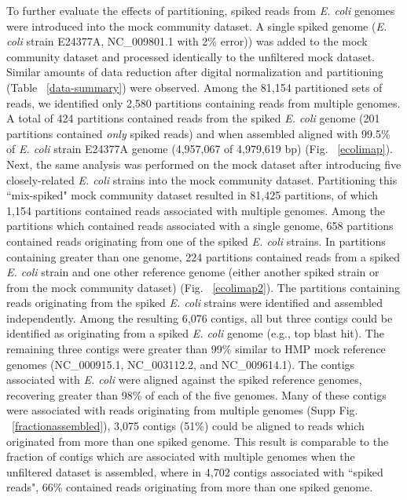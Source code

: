 \documentclass[11pt]{article} %
\begin{document}
To further evaluate the effects of partitioning, spiked reads from \emph{E. coli} genomes were introduced into the mock community dataset. A single spiked genome (\emph{E. coli} strain E24377A, NC\_009801.1 with 2\% error)) was added to the mock community dataset and processed identically to the unfiltered mock dataset.  Similar amounts of data reduction after digital normalization and partitioning (Table ~\ref{data-summary}) were observed.  Among the 81,154 partitioned sets of reads, we identified only 2,580 partitions containing reads from multiple genomes.  A total of 424 partitions contained reads from the spiked \emph{E. coli} genome (201 partitions contained \emph{only} spiked reads) and when assembled aligned with 99.5\% of \emph{E. coli} strain E24377A genome (4,957,067 of 4,979,619 bp) (Fig. ~\ref{ecolimap}).  Next, the same analysis was performed on the mock dataset after introducing five closely-related \emph{E. coli} strains into the mock community dataset.  Partitioning this ``mix-spiked" mock community dataset resulted in 81,425 partitions, of which 1,154 partitions contained reads associated with multiple genomes.  Among the partitions which contained reads associated with a single genome, 658 partitions contained reads originating from one of the spiked \emph{E. coli} strains.  In partitions containing greater than one genome, 224 partitions contained reads from a spiked \emph{E. coli} strain and one other reference genome (either another spiked strain or from the mock community dataset) (Fig. ~\ref{ecolimap2}).  The partitions containing reads originating from the spiked \emph{E. coli} strains were identified and assembled independently.  Among the resulting 6,076 contigs, all but three contigs could be identified as originating from a spiked \emph{E. coli} genome (e.g., top blast hit).  The remaining three contigs were greater than 99\% similar to HMP mock reference genomes (NC\_000915.1, NC\_003112.2, and NC\_009614.1).  The contigs associated with \emph{E. coli} were aligned against the spiked reference genomes, recovering greater than 98\% of each of the five genomes.  Many of these contigs were associated with reads originating from multiple genomes (Supp Fig. ~\ref{fractionassembled}), 3,075 contigs (51\%) could be aligned to reads which originated from more than one spiked genome.  This result is comparable to the fraction of contigs which are associated with multiple genomes when the unfiltered dataset is assembled, where in 4,702 contigs associated with ``spiked reads", 66\% contained reads originating from more than one spiked genome.
\end{document}
